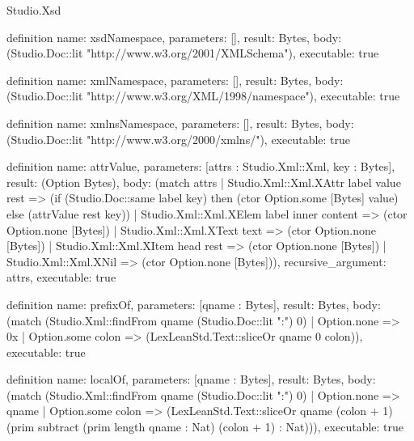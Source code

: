 \begin{lexlean}{Studio.Xsd}
\begin{semanticmodule}
definition{
  name: xsdNamespace,
  parameters: [],
  result: Bytes,
  body: (Studio.Doc::lit "http://www.w3.org/2001/XMLSchema"),
  executable: true
}

definition{
  name: xmlNamespace,
  parameters: [],
  result: Bytes,
  body: (Studio.Doc::lit "http://www.w3.org/XML/1998/namespace"),
  executable: true
}

definition{
  name: xmlnsNamespace,
  parameters: [],
  result: Bytes,
  body: (Studio.Doc::lit "http://www.w3.org/2000/xmlns/"),
  executable: true
}

definition{
  name: attrValue,
  parameters: [attrs : Studio.Xml::Xml, key : Bytes],
  result: (Option Bytes),
  body: (match attrs
    | Studio.Xml::Xml.XAttr label value rest => (if (Studio.Doc::same label key) then (ctor Option.some [Bytes] value) else (attrValue rest key))
    | Studio.Xml::Xml.XElem label inner content => (ctor Option.none [Bytes])
    | Studio.Xml::Xml.XText text => (ctor Option.none [Bytes])
    | Studio.Xml::Xml.XItem head rest => (ctor Option.none [Bytes])
    | Studio.Xml::Xml.XNil => (ctor Option.none [Bytes])),
  recursive_argument: attrs,
  executable: true
}

definition{
  name: prefixOf,
  parameters: [qname : Bytes],
  result: Bytes,
  body: (match (Studio.Xml::findFrom qname (Studio.Doc::lit ":") 0)
    | Option.none => 0x
    | Option.some colon => (LexLeanStd.Text::sliceOr qname 0 colon)),
  executable: true
}

definition{
  name: localOf,
  parameters: [qname : Bytes],
  result: Bytes,
  body: (match (Studio.Xml::findFrom qname (Studio.Doc::lit ":") 0)
    | Option.none => qname
    | Option.some colon => (LexLeanStd.Text::sliceOr qname (colon + 1) (prim subtract (prim length qname : Nat) (colon + 1) : Nat))),
  executable: true
}


\end{semanticmodule}
\end{lexlean}
